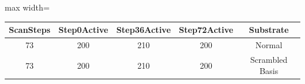 \begin{table}[h]
\centering
\begin{adjustbox}{max width=\textwidth}
\begin{tabular}{ |c|c|c|c|c| }
\hline
ScanSteps & Step0Active & Step36Active & Step72Active & Substrate \\
\hline
73 & 200 & 210 & 200 & Normal \\
\hline
73 & 200 & 210 & 200 & Scrambled Basis \\
\hline
\end{tabular}
\end{adjustbox}
\end{table}
